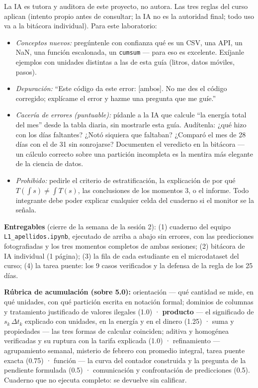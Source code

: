 \documentclass[12pt,letterpaper]{article}
\begin{document}
\begin{cajaia}
La IA es tutora y auditora de este proyecto, no autora. Las tres reglas del curso aplican (intento propio antes de consultar; la IA no es la autoridad final; todo uso va a la bitácora individual). Para este laboratorio:
\begin{itemize}[itemsep=0.15em]
    \item \emph{Conceptos nuevos:} pregúntenle con confianza qué es un CSV, una API, un NaN, una función escalonada, un \texttt{cumsum} --- para eso es excelente. Exíjanle ejemplos con unidades distintas a las de esta guía (litros, datos móviles, pasos).
    \item \emph{Depuración:} ``Este código da este error: [ambos]. No me des el código corregido; explícame el error y hazme una pregunta que me guíe.''
    \item \emph{Cacería de errores (puntuable):} pídanle a la IA que calcule ``la energía total del mes'' desde la tabla diaria, sin mostrarle esta guía. Audítenla: ¿qué hizo con los días faltantes? ¿Notó siquiera que faltaban? ¿Comparó el mes de 28 días con el de 31 sin sonrojarse? Documenten el veredicto en la bitácora --- un cálculo correcto sobre una partición incompleta es la mentira más elegante de la ciencia de datos.
    \item \emph{Prohibido:} pedirle el criterio de estratificación, la explicación de por qué $T(\int s)\neq\int T(s)$, las conclusiones de los momentos 3, o el informe. Todo integrante debe poder explicar cualquier celda del cuaderno si el monitor se la señala.
\end{itemize}
\end{cajaia}

\begin{cajaentrega}
\textbf{Entregables} (cierre de la semana de la sesión 2): (1) cuaderno del equipo \texttt{L1\_apellidos.ipynb}, ejecutado de arriba a abajo sin errores, con las predicciones fotografiadas y los tres momentos completos de ambas sesiones; (2) bitácora de IA individual (1 página); (3) la fila de cada estudiante en el microdataset del curso; (4) la tarea puente: los 9 casos verificados y la defensa de la regla de los 25 días.

\textbf{Rúbrica de acumulación (sobre 5.0):} orientación --- qué cantidad se mide, en qué unidades, con qué partición escrita en notación formal; dominios de columnas y tratamiento justificado de valores ilegales (1.0) · \textbf{producto} --- el significado de $s_k\,\Delta t_k$ explicado con unidades, en la energía y en el dinero (1.25) · suma y propiedades --- las tres formas de calcular coinciden; aditiva y homogénea verificadas y su ruptura con la tarifa explicada (1.0) · refinamiento --- agrupamiento semanal, misterio de febrero con promedio integral, tarea puente exacta (0.75) · función --- la curva del contador construida y la pregunta de la pendiente formulada (0.5) · comunicación y confrontación de predicciones (0.5). Cuaderno que no ejecuta completo: se devuelve sin calificar.
\end{cajaentrega}
\end{document}
